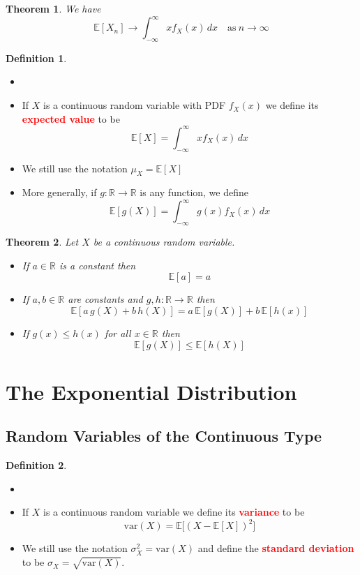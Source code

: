 \documentclass{article}
\newcommand{\R}{\mathbb{R}}
\newcommand{\E}{\mathbb{E}}
\newcommand{\var}{\text{var}}
\newcommand{\bfred}[1]{\textcolor{red}{\textbf{#1}}}
\theoremstyle{plain}
\newtheorem{thm}{Theorem}[section]
\theoremstyle{definition}
\newtheorem{defn}{Definition}[section]
\theoremstyle{remark}
\begin{document}
\begin{thm}
    We have \[\E[X_n] \rightarrow \int_{-\infty}^\infty xf_X(x)\,dx \quad \text{as} \ n \rightarrow \infty\]
\end{thm}

\begin{defn}
    \begin{itemize}
        \item []
        \item If $X$ is a continuous random variable with PDF $f_X(x)$ we define its \bfred{expected value} to be \[\E[X]=\int_{-\infty}^\infty xf_X(x)\,dx\] 
        \item We still use the notation $\mu_X=\E[X]$
        \item More generally, if $g:\R\rightarrow\R$ is any function, we define \[\E[g(X)]=\int_{-\infty}^\infty g(x)f_X(x)\,dx\]
    \end{itemize}
\end{defn}

\begin{thm}
    Let $X$ be a continuous random variable.
    \begin{itemize}
        \item If $a \in \R$ is a constant then \[\E[a]=a\] 
        \item If $a,b\in\R$ are constants and $g,h:\R\rightarrow\R$ then \[\E[a\,g(X)+b\,h(X)]=a\,\E[g(X)]+b\,\E[h(x)]\] 
        \item If $g(x)\leq h(x)$ for all $x\in\R$ then \[\E[g(X)]\leq\E[h(X)]\]
    \end{itemize}
\end{thm}

\section{The Exponential Distribution}

\subsection{Random Variables of the Continuous Type}

\begin{defn}
    \begin{itemize}
        \item[]
        \item If $X$ is a continuous random variable we define its \bfred{variance} to be \[\var(X)=\E\Big[(X-\E[X])^2\Big]\] 
        \item We still use the notation $\sigma_X^2=\var(X)$ and define the \bfred{standard deviation} to be $\sigma_X=\sqrt{\var(X)}$.
    \end{itemize}
\end{defn}
\end{document}
